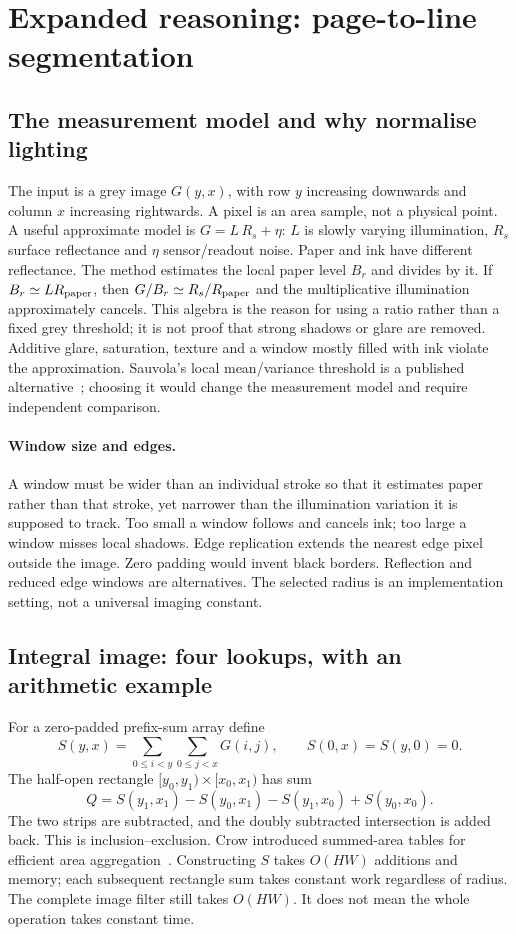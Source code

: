 \section{Expanded reasoning: page-to-line segmentation}
\label{sec:expand-segment}
\subsection{The measurement model and why normalise lighting}
The input is a grey image $G(y,x)$, with row $y$ increasing downwards and
column $x$ increasing rightwards. A pixel is an area sample, not a physical
point. A useful approximate model is $G=L\,R_s+\eta$: $L$ is slowly varying
illumination, $R_s$ surface reflectance and $\eta$ sensor/readout noise.
Paper and ink have different reflectance. The method estimates the local
paper level $B_r$ and divides by it. If $B_r\simeq L R_{\rm paper}$,
then $G/B_r\simeq R_s/R_{\rm paper}$ and the multiplicative illumination
approximately cancels. This algebra is the reason for using a ratio rather
than a fixed grey threshold; it is not proof that strong shadows or glare
are removed. Additive glare, saturation, texture and a window mostly filled
with ink violate the approximation. Sauvola's local mean/variance threshold
is a published alternative~\cite{sauvola2000}; choosing it would change the
measurement model and require independent comparison.

\paragraph{Window size and edges.}
A window must be wider than an individual stroke so that it estimates paper
rather than that stroke, yet narrower than the illumination variation it
is supposed to track. Too small a window follows and cancels ink; too large
a window misses local shadows. Edge replication extends the nearest edge
pixel outside the image. Zero padding would invent black borders. Reflection
and reduced edge windows are alternatives. The selected radius is an
implementation setting, not a universal imaging constant.

\subsection{Integral image: four lookups, with an arithmetic example}
For a zero-padded prefix-sum array define
\[
S(y,x)=\sum_{0\leq i<y}\sum_{0\leq j<x}G(i,j),\qquad S(0,x)=S(y,0)=0.
\]
The half-open rectangle $[y_0,y_1)\times[x_0,x_1)$ has sum
\[
Q=S(y_1,x_1)-S(y_0,x_1)-S(y_1,x_0)+S(y_0,x_0).
\]
The two strips are subtracted, and the doubly subtracted intersection is
added back. This is inclusion--exclusion. Crow introduced summed-area tables
for efficient area aggregation~\cite{crow1984}. Constructing $S$ takes
$O(HW)$ additions and memory; each subsequent rectangle sum takes constant
work regardless of radius. The complete image filter still takes $O(HW)$.
It does not mean the whole operation takes constant time.

